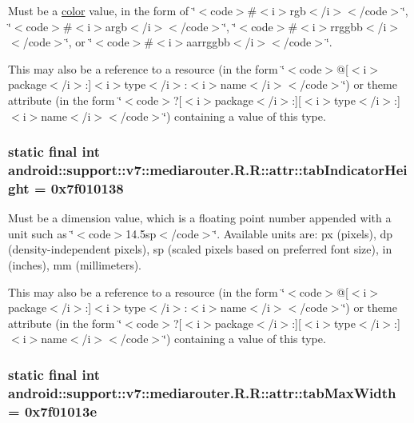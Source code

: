 Must be a \hyperlink{classandroid_1_1support_1_1v7_1_1mediarouter_1_1_r_1_1color}{color} value, in the form of \char`\"{}$<$code$>$\#$<$i$>$rgb$<$/i$>$$<$/code$>$\char`\"{}, \char`\"{}$<$code$>$\#$<$i$>$argb$<$/i$>$$<$/code$>$\char`\"{}, \char`\"{}$<$code$>$\#$<$i$>$rrggbb$<$/i$>$$<$/code$>$\char`\"{}, or \char`\"{}$<$code$>$\#$<$i$>$aarrggbb$<$/i$>$$<$/code$>$\char`\"{}. 

This may also be a reference to a resource (in the form \char`\"{}$<$code$>$@\mbox{[}$<$i$>$package$<$/i$>$:\mbox{]}$<$i$>$type$<$/i$>$:$<$i$>$name$<$/i$>$$<$/code$>$\char`\"{}) or theme attribute (in the form \char`\"{}$<$code$>$?\mbox{[}$<$i$>$package$<$/i$>$:\mbox{]}\mbox{[}$<$i$>$type$<$/i$>$:\mbox{]}$<$i$>$name$<$/i$>$$<$/code$>$\char`\"{}) containing a value of this type. \hypertarget{classandroid_1_1support_1_1v7_1_1mediarouter_1_1_r_1_1attr_7ff7fc43f7671b10f1c0e1b38d77ada9}{
\subsubsection[{tabIndicatorHeight}]{\setlength{\rightskip}{0pt plus 5cm}static final int android::support::v7::mediarouter.R.R::attr::tabIndicatorHeight = 0x7f010138}}
\label{classandroid_1_1support_1_1v7_1_1mediarouter_1_1_r_1_1attr_7ff7fc43f7671b10f1c0e1b38d77ada9}


Must be a dimension value, which is a floating point number appended with a unit such as \char`\"{}$<$code$>$14.5sp$<$/code$>$\char`\"{}. Available units are: px (pixels), dp (density-independent pixels), sp (scaled pixels based on preferred font size), in (inches), mm (millimeters). 

This may also be a reference to a resource (in the form \char`\"{}$<$code$>$@\mbox{[}$<$i$>$package$<$/i$>$:\mbox{]}$<$i$>$type$<$/i$>$:$<$i$>$name$<$/i$>$$<$/code$>$\char`\"{}) or theme attribute (in the form \char`\"{}$<$code$>$?\mbox{[}$<$i$>$package$<$/i$>$:\mbox{]}\mbox{[}$<$i$>$type$<$/i$>$:\mbox{]}$<$i$>$name$<$/i$>$$<$/code$>$\char`\"{}) containing a value of this type. \hypertarget{classandroid_1_1support_1_1v7_1_1mediarouter_1_1_r_1_1attr_46a7d64455d33d4df2a226f5e25fefca}{
\subsubsection[{tabMaxWidth}]{\setlength{\rightskip}{0pt plus 5cm}static final int android::support::v7::mediarouter.R.R::attr::tabMaxWidth = 0x7f01013e}}
\label{classandroid_1_1support_1_1v7_1_1mediarouter_1_1_r_1_1attr_46a7d64455d33d4df2a226f5e25fefca}



